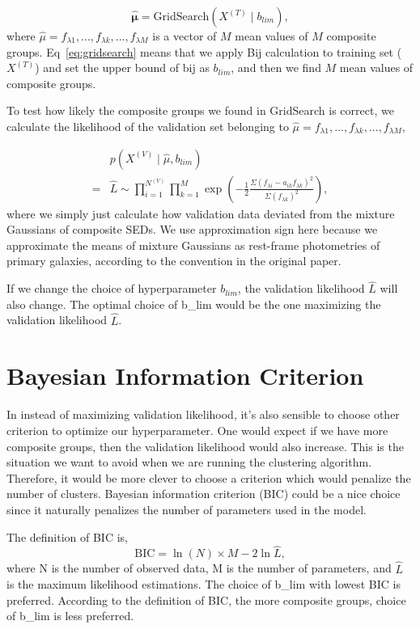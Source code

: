 \documentclass[12pt,letterpaper]{article}
\begin{document}
\begin{equation}
    \hat{ \mathbf{\mu} } = 
    \mathrm{GridSearch}(X^{(T)} \mid b_{lim}),
    \label{eq:gridsearch}
\end{equation}
where $\hat{\mu} = f_{\lambda 1}, ..., f_{\lambda k}, ..., f_{\lambda M}$ is a vector of $M$ mean values of $M$ composite groups.
Eq~\ref{eq:gridsearch} means that we apply Bij calculation to training set ($X^{(T)}$) and set the upper bound of bij as $b_{lim}$, and then we find $M$ mean values of composite groups.

To test how likely the composite groups we found in GridSearch is correct, we calculate the likelihood of the validation set belonging to $\hat \mu = f_{\lambda 1}, ..., f_{\lambda k}, ..., f_{\lambda M}$,

\begin{equation}
    \begin{split}
        &p(X^{(V)} \mid \hat \mu, b_{lim}) \\ 
        = &\hat L 
        \sim
        \prod_{i=1}^{N^{(V)}} \prod_{k=1}^{M}         
        \exp{\left( - \frac{1}{2} \frac{ \Sigma (f_{\lambda i} - a_{ik} f_{\lambda k} )^2 }{\Sigma (f_{\lambda k})^2} \right)},   
    \end{split}
    \label{eq:likelihood}
\end{equation}
where we simply just calculate how validation data deviated from the mixture Gaussians of composite SEDs.
We use approximation sign here because we approximate the means of mixture Gaussians as rest-frame photometries of primary galaxies, according to the convention in the original paper.

If we change the choice of hyperparameter $b_{lim}$, the validation likelihood $\hat L$ will also change.
The optimal choice of b\_lim would be the one maximizing the validation likelihood $\hat L$.


\section*{Bayesian Information Criterion}
In instead of maximizing validation likelihood, it's also sensible to choose other criterion to optimize our hyperparameter.
One would expect if we have more composite groups, then the validation likelihood would also increase.
This is the situation we want to avoid when we are running the clustering algorithm.
Therefore, it would be more clever to choose a criterion which would penalize the number of clusters.
Bayesian information criterion (BIC) could be a nice choice since it naturally penalizes the number of parameters used in the model.

The definition of BIC is,
\begin{equation}
    \mathrm{BIC} = \ln{(N)} \times M - 2\ln{\hat L},
\end{equation}
where N is the number of observed data, M is the number of parameters, and $\hat L$ is the maximum likelihood estimations.
The choice of b\_lim with lowest BIC is preferred. 
According to the definition of BIC, the more composite groups, choice of b\_lim is less preferred.
\end{document}
